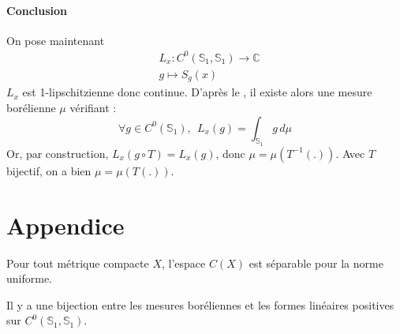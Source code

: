 \documentclass{article}
\begin{document}
\paragraph{Conclusion}
On pose maintenant 
\[
\begin{aligned}
&L_x: C^0(\mathbb{S}_1,\mathbb{S}_1) \to \mathbb{C} \\
&g \mapsto S_g(x)
\end{aligned}
\]
$L_x$ est 1-lipschitzienne donc continue. D'après le , il existe alors une mesure borélienne $\mu$ vérifiant :
\[
\forall g \in C^0(\mathbb{S}_1), \: \: L_x(g) = \int_{\mathbb{S}_1} g \, d\mu
\]
Or, par construction, $L_x(g \circ T) = L_x(g)$, donc $\mu = \mu(T^{-1}(.))$. Avec $T$ bijectif, on a bien $\mu = \mu(T(.))$.

\section*{Appendice}
\begin{mthm}{1}\label{foo}
Pour tout métrique compacte $X$, l'espace $C(X)$ est séparable pour la norme uniforme.
\end{mthm}

\begin{mthm}{2}\label{fooo}
Il y a une bijection entre les mesures boréliennes et les formes linéaires positives sur $C^0(\mathbb{S}_1,\mathbb{S}_1)$.
\end{mthm}
\end{document}
